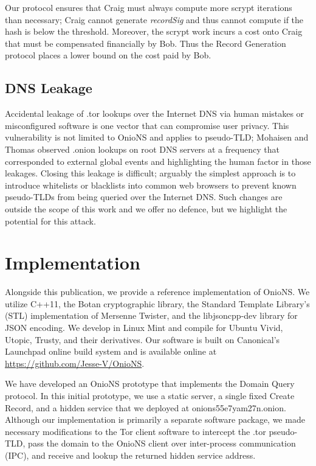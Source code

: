 \documentclass{sig-alternate}
\begin{document}

Our protocol ensures that Craig must always compute more scrypt iterations than necessary; Craig cannot generate \emph{recordSig} and thus cannot compute if the hash is below the threshold. Moreover, the scrypt work incurs a cost onto Craig that must be compensated financially by Bob. Thus the Record Generation protocol places a lower bound on the cost paid by Bob.

\subsection{DNS Leakage}

Accidental leakage of .tor lookups over the Internet DNS via human mistakes or misconfigured software is one vector that can compromise user privacy. This vulnerability is not limited to OnioNS and applies to pseudo-TLD; Mohaisen and Thomas observed .onion lookups on root DNS servers at a frequency that corresponded to external global events and highlighting the human factor in those leakages.\cite{thomasmeasuring} Closing this leakage is difficult; arguably the simplest approach is to introduce whitelists or blacklists into common web browsers to prevent known pseudo-TLDs from being queried over the Internet DNS. Such changes are outside the scope of this work and we offer no defence, but we highlight the potential for this attack.

\section{Implementation}

Alongside this publication, we provide a reference implementation of OnioNS. We utilize C++11, the Botan cryptographic library, the Standard Template Library's (STL) implementation of Mersenne Twister, and the libjsoncpp-dev library for JSON encoding. We develop in Linux Mint and compile for Ubuntu Vivid, Utopic, Trusty, and their derivatives. Our software is built on Canonical's Launchpad online build system and is available online at \url{https://github.com/Jesse-V/OnioNS}. 

We have developed an OnioNS prototype that implements the Domain Query protocol. In this initial prototype, we use a static server, a single fixed Create Record, and a hidden service that we deployed at onions55e7yam27n.onion. Although our implementation is primarily a separate software package, we made necessary modifications to the Tor client software to intercept the .tor pseudo-TLD, pass the domain to the OnioNS client over inter-process communication (IPC), and receive and lookup the returned hidden service address.
\end{document}
